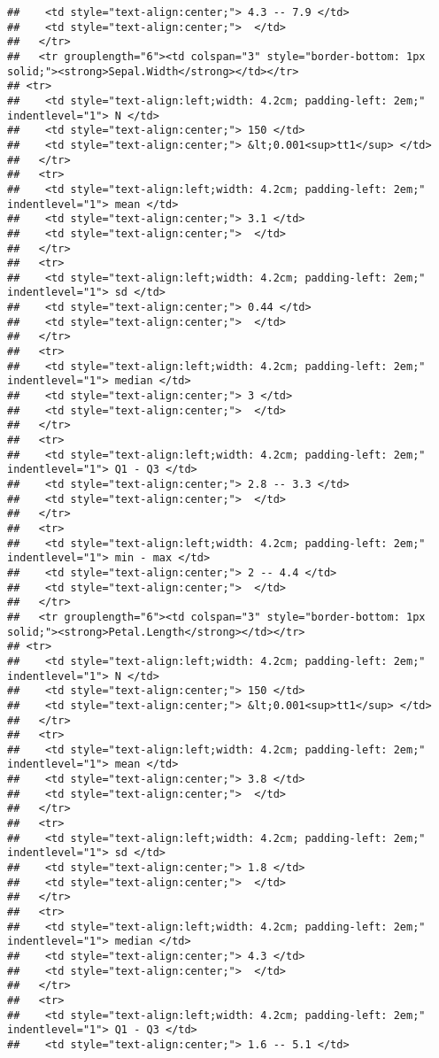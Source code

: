 \documentclass[
]{article}
\begin{document}
\begin{verbatim}
##    <td style="text-align:center;"> 4.3 -- 7.9 </td>
##    <td style="text-align:center;">  </td>
##   </tr>
##   <tr grouplength="6"><td colspan="3" style="border-bottom: 1px solid;"><strong>Sepal.Width</strong></td></tr>
## <tr>
##    <td style="text-align:left;width: 4.2cm; padding-left: 2em;" indentlevel="1"> N </td>
##    <td style="text-align:center;"> 150 </td>
##    <td style="text-align:center;"> &lt;0.001<sup>tt1</sup> </td>
##   </tr>
##   <tr>
##    <td style="text-align:left;width: 4.2cm; padding-left: 2em;" indentlevel="1"> mean </td>
##    <td style="text-align:center;"> 3.1 </td>
##    <td style="text-align:center;">  </td>
##   </tr>
##   <tr>
##    <td style="text-align:left;width: 4.2cm; padding-left: 2em;" indentlevel="1"> sd </td>
##    <td style="text-align:center;"> 0.44 </td>
##    <td style="text-align:center;">  </td>
##   </tr>
##   <tr>
##    <td style="text-align:left;width: 4.2cm; padding-left: 2em;" indentlevel="1"> median </td>
##    <td style="text-align:center;"> 3 </td>
##    <td style="text-align:center;">  </td>
##   </tr>
##   <tr>
##    <td style="text-align:left;width: 4.2cm; padding-left: 2em;" indentlevel="1"> Q1 - Q3 </td>
##    <td style="text-align:center;"> 2.8 -- 3.3 </td>
##    <td style="text-align:center;">  </td>
##   </tr>
##   <tr>
##    <td style="text-align:left;width: 4.2cm; padding-left: 2em;" indentlevel="1"> min - max </td>
##    <td style="text-align:center;"> 2 -- 4.4 </td>
##    <td style="text-align:center;">  </td>
##   </tr>
##   <tr grouplength="6"><td colspan="3" style="border-bottom: 1px solid;"><strong>Petal.Length</strong></td></tr>
## <tr>
##    <td style="text-align:left;width: 4.2cm; padding-left: 2em;" indentlevel="1"> N </td>
##    <td style="text-align:center;"> 150 </td>
##    <td style="text-align:center;"> &lt;0.001<sup>tt1</sup> </td>
##   </tr>
##   <tr>
##    <td style="text-align:left;width: 4.2cm; padding-left: 2em;" indentlevel="1"> mean </td>
##    <td style="text-align:center;"> 3.8 </td>
##    <td style="text-align:center;">  </td>
##   </tr>
##   <tr>
##    <td style="text-align:left;width: 4.2cm; padding-left: 2em;" indentlevel="1"> sd </td>
##    <td style="text-align:center;"> 1.8 </td>
##    <td style="text-align:center;">  </td>
##   </tr>
##   <tr>
##    <td style="text-align:left;width: 4.2cm; padding-left: 2em;" indentlevel="1"> median </td>
##    <td style="text-align:center;"> 4.3 </td>
##    <td style="text-align:center;">  </td>
##   </tr>
##   <tr>
##    <td style="text-align:left;width: 4.2cm; padding-left: 2em;" indentlevel="1"> Q1 - Q3 </td>
##    <td style="text-align:center;"> 1.6 -- 5.1 </td>

\end{verbatim}
\end{document}

